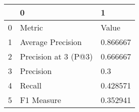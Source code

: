 \begin{tabular}{lll}
\toprule
{} &                     0 &         1 \\
\midrule
0 &                Metric &     Value \\
1 &     Average Precision &  0.866667 \\
2 &  Precision at 3 (P@3) &  0.666667 \\
3 &             Precision &       0.3 \\
4 &                Recall &  0.428571 \\
5 &            F1 Measure &  0.352941 \\
\bottomrule
\end{tabular}
